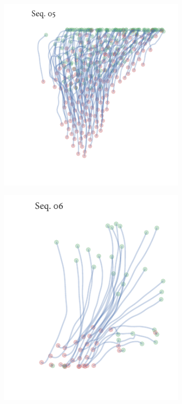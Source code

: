 \begin{figure}[h]
\begin{subfigure}[t]{0.5\textwidth}
		\includegraphics{streamline_sequence05.pdf}
	\end{subfigure}%
	\begin{subfigure}[t]{0.5\textwidth}
		\centering
		\includegraphics{streamline_sequence06.pdf}
	\end{subfigure}
\end{figure}

